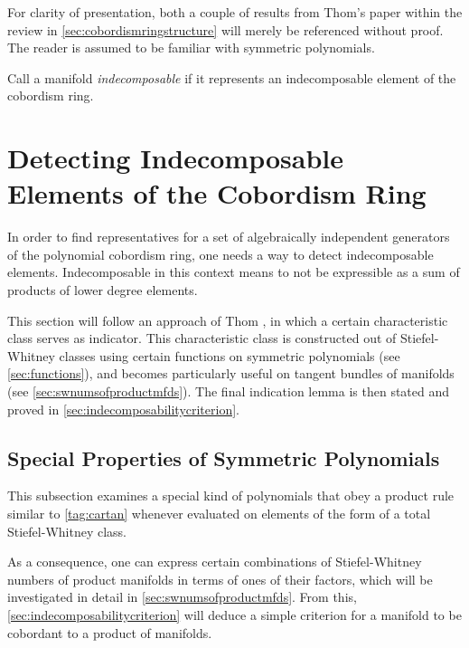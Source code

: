For clarity of presentation, both a couple of results from Thom's
paper \cite{thom} within the review in
\autoref{sec:cobordismringstructure} will merely be referenced without
proof.
The reader is assumed to be familiar with symmetric polynomials.

Call a manifold \emph{indecomposable} if it
represents an indecomposable element of the cobordism ring.

\section{Detecting Indecomposable Elements of the Cobordism Ring}
\label{sec:indecomposableelements}
In order to find representatives for a set of algebraically
independent generators of the polynomial cobordism ring, one needs a
way to detect indecomposable elements. Indecomposable in this 
context means to not be expressible as a sum of products of lower
degree elements.

This section will follow an approach of Thom 
\cite[Chapters~IV.5 and~IV.6]{thom}, in which a certain characteristic
class serves as indicator. This characteristic class is constructed
out of Stiefel-Whitney classes using certain functions on symmetric
polynomials (see \autoref{sec:functions}), and becomes particularly
useful on tangent bundles of manifolds (see
\autoref{sec:swnumsofproductmfds}). The final indication lemma is then
stated and proved in \autoref{sec:indecomposabilitycriterion}.

\subsection{Special Properties of Symmetric Polynomials}\label{sec:functions}
This subsection examines a special kind of polynomials that
obey a product rule similar to \ref{tag:cartan} whenever evaluated on
elements of the form of a total Stiefel-Whitney class.

As a consequence, one can express certain combinations of
Stiefel-Whitney numbers of product manifolds in terms of ones of their
factors, which will be investigated in detail in
\autoref{sec:swnumsofproductmfds}.
From this, \autoref{sec:indecomposabilitycriterion} will deduce a
simple criterion for a manifold to be cobordant to a product of
manifolds.


